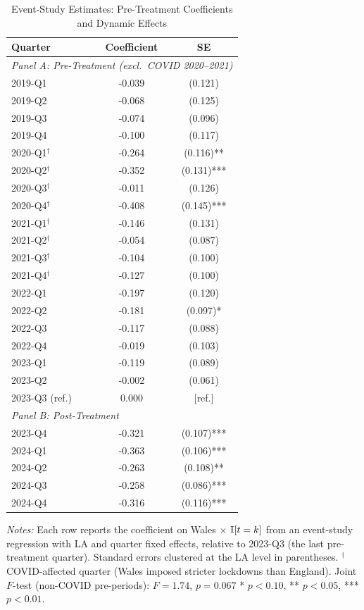 \begin{table}[H]
\centering
\caption{Event-Study Estimates: Pre-Treatment Coefficients and Dynamic Effects}
\label{tab:eventstudy}
\begin{threeparttable}
\begin{tabular}{lcc}
\toprule
Quarter & Coefficient & SE \\
\midrule
\multicolumn{3}{l}{\textit{Panel A: Pre-Treatment (excl.\ COVID 2020--2021)}} \\
2019-Q1 & -0.039 & (0.121) \\
2019-Q2 & -0.068 & (0.125) \\
2019-Q3 & -0.074 & (0.096) \\
2019-Q4 & -0.100 & (0.117) \\
2020-Q1$^{\dagger}$ & -0.264 & (0.116)** \\
2020-Q2$^{\dagger}$ & -0.352 & (0.131)*** \\
2020-Q3$^{\dagger}$ & -0.011 & (0.126) \\
2020-Q4$^{\dagger}$ & -0.408 & (0.145)*** \\
2021-Q1$^{\dagger}$ & -0.146 & (0.131) \\
2021-Q2$^{\dagger}$ & -0.054 & (0.087) \\
2021-Q3$^{\dagger}$ & -0.104 & (0.100) \\
2021-Q4$^{\dagger}$ & -0.127 & (0.100) \\
2022-Q1 & -0.197 & (0.120) \\
2022-Q2 & -0.181 & (0.097)* \\
2022-Q3 & -0.117 & (0.088) \\
2022-Q4 & -0.019 & (0.103) \\
2023-Q1 & -0.119 & (0.089) \\
2023-Q2 & -0.002 & (0.061) \\
2023-Q3 (ref.) & 0.000 & [ref.] \\
\midrule
\multicolumn{3}{l}{\textit{Panel B: Post-Treatment}} \\
2023-Q4 & -0.321 & (0.107)*** \\
2024-Q1 & -0.363 & (0.106)*** \\
2024-Q2 & -0.263 & (0.108)** \\
2024-Q3 & -0.258 & (0.086)*** \\
2024-Q4 & -0.316 & (0.116)*** \\
\bottomrule
\end{tabular}
\begin{tablenotes}[flushleft]
\small
\item \textit{Notes:} Each row reports the coefficient on Wales $\times$ $\mathbb{I}[t = k]$ from an event-study regression with LA and quarter fixed effects, relative to 2023-Q3 (the last pre-treatment quarter). Standard errors clustered at the LA level in parentheses. $^{\dagger}$COVID-affected quarter (Wales imposed stricter lockdowns than England). Joint $F$-test (non-COVID pre-periods): $F = 1.74$, $p = 0.067$ * $p<0.10$, ** $p<0.05$, *** $p<0.01$.
\end{tablenotes}
\end{threeparttable}
\end{table}
